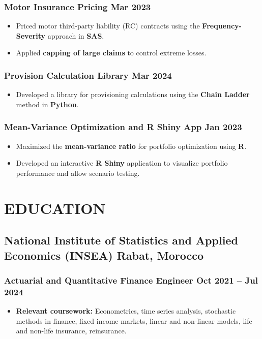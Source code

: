 \documentclass[11pt]{amdresume}
\begin{document}
\subsubsection{Motor Insurance Pricing \dotfill Mar 2023}
\begin{itemize}
    \item Priced motor third-party liability (RC) contracts using the \textbf{Frequency-Severity} approach in \textbf{SAS}.
    \item Applied \textbf{capping of large claims} to control extreme losses.
\end{itemize}


\subsubsection{Provision Calculation Library \dotfill Mar 2024}
\begin{itemize}
    \item Developed a library for provisioning calculations using the \textbf{Chain Ladder} method in \textbf{Python}.
\end{itemize}

\subsubsection{Mean-Variance Optimization and R Shiny App \dotfill Jan 2023}
\begin{itemize}
    \item Maximized the \textbf{mean-variance ratio} for portfolio optimization using \textbf{R}.
    \item Developed an interactive \textbf{R Shiny} application to visualize portfolio performance and allow scenario testing.
\end{itemize}



\section{EDUCATION}

\subsection{National Institute of Statistics and Applied Economics (INSEA) \hfill Rabat, Morocco}
\subsubsection{Actuarial and Quantitative Finance Engineer \dotfill Oct 2021 – Jul 2024}
\begin{itemize}
\item \textbf{Relevant coursework:} Econometrics, time series analysis, stochastic methods in finance, fixed income markets, linear and non-linear models, life and non-life insurance, reinsurance.
\end{itemize}
\end{document}
